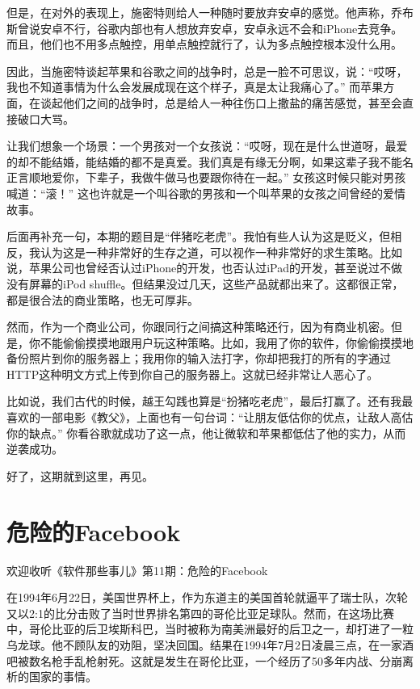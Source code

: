 \documentclass[
  letterpaper,
  DIV=11,
  numbers=noendperiod]{scrreprt}
\begin{document}
但是，在对外的表现上，施密特则给人一种随时要放弃安卓的感觉。他声称，乔布斯曾说安卓不行，谷歌内部也有人想放弃安卓，安卓永远不会和iPhone去竞争。而且，他们也不用多点触控，用单点触控就行了，认为多点触控根本没什么用。

因此，当施密特谈起苹果和谷歌之间的战争时，总是一脸不可思议，说：``哎呀，我也不知道事情为什么会发展成现在这个样子，真是太让我痛心了。''
而苹果方面，在谈起他们之间的战争时，总是给人一种往伤口上撒盐的痛苦感觉，甚至会直接破口大骂。

让我们想象一个场景：一个男孩对一个女孩说：``哎呀，现在是什么世道呀，最爱的却不能结婚，能结婚的都不是真爱。我们真是有缘无分啊，如果这辈子我不能名正言顺地爱你，下辈子，我做牛做马也要跟你待在一起。''
女孩这时候只能对男孩喊道：``滚！''
这也许就是一个叫谷歌的男孩和一个叫苹果的女孩之间曾经的爱情故事。

后面再补充一句，本期的题目是``伴猪吃老虎''。我怕有些人认为这是贬义，但相反，我认为这是一种非常好的生存之道，可以视作一种非常好的求生策略。比如说，苹果公司也曾经否认过iPhone的开发，也否认过iPad的开发，甚至说过不做没有屏幕的iPod
shuffle。但结果没过几天，这些产品就都出来了。这都很正常，都是很合法的商业策略，也无可厚非。

然而，作为一个商业公司，你跟同行之间搞这种策略还行，因为有商业机密。但是，你不能偷偷摸摸地跟用户玩这种策略。比如，我用了你的软件，你偷偷摸摸地备份照片到你的服务器上；我用你的输入法打字，你却把我打的所有的字通过HTTP这种明文方式上传到你自己的服务器上。这就已经非常让人恶心了。

比如说，我们古代的时候，越王勾践也算是``扮猪吃老虎''，最后打赢了。还有我最喜欢的一部电影《教父》，上面也有一句台词：``让朋友低估你的优点，让敌人高估你的缺点。''
你看谷歌就成功了这一点，他让微软和苹果都低估了他的实力，从而逆袭成功。

好了，这期就到这里，再见。


\chapter{危险的Facebook}\label{ux5371ux9669ux7684facebook}

欢迎收听《软件那些事儿》第11期：危险的Facebook

在1994年6月22日，美国世界杯上，作为东道主的美国首轮就逼平了瑞士队，次轮又以2:1的比分击败了当时世界排名第四的哥伦比亚足球队。然而，在这场比赛中，哥伦比亚的后卫埃斯科巴，当时被称为南美洲最好的后卫之一，却打进了一粒乌龙球。他不顾队友的劝阻，坚决回国。结果在1994年7月2日凌晨三点，在一家酒吧被数名枪手乱枪射死。这就是发生在哥伦比亚，一个经历了50多年内战、分崩离析的国家的事情。
\end{document}
